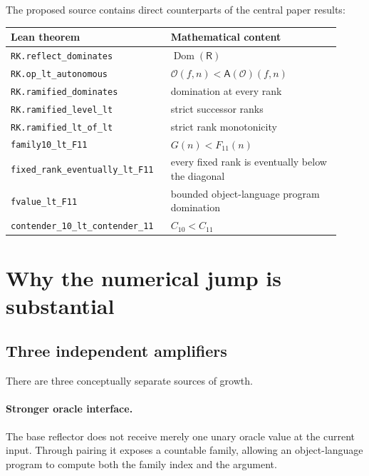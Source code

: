 \documentclass[11pt,oneside]{article}
\theoremstyle{definition}
\newcommand{\Op}{\mathcal O}
\newcommand{\Reflect}{\mathsf R}
\newcommand{\Auto}{\mathsf A}
\newcommand{\code}[1]{\texttt{#1}}
\begin{document}
\begin{summarybox}
The proposed source contains direct counterparts of the central paper results:
\begin{center}
\begin{tabular}{@{}p{0.43\linewidth}p{0.49\linewidth}@{}}
\toprule
Lean theorem & Mathematical content \\
\midrule
\code{RK.reflect\_dominates} & $\operatorname{Dom}(\Reflect)$ \\
\code{RK.op\_lt\_autonomous} & $\Op(f,n)<\Auto(\Op)(f,n)$ \\
\code{RK.ramified\_dominates} & domination at every rank \\
\code{RK.ramified\_level\_lt} & strict successor ranks \\
\code{RK.ramified\_lt\_of\_lt} & strict rank monotonicity \\
\code{family10\_lt\_F11} & $G(n)<F_{11}(n)$ \\
\code{fixed\_rank\_eventually\_lt\_F11} & every fixed rank is eventually below the diagonal \\
\code{fvalue\_lt\_F11} & bounded object-language program domination \\
\code{contender\_10\_lt\_contender\_11} & $C_{10}<C_{11}$ \\
\bottomrule
\end{tabular}
\end{center}
\end{summarybox}

\section{Why the numerical jump is substantial}

\subsection{Three independent amplifiers}

There are three conceptually separate sources of growth.

\paragraph{Stronger oracle interface.}
The base reflector does not receive merely one unary oracle value at the
current input.  Through pairing it exposes a countable family, allowing an
object-language program to compute both the family index and the argument.
\end{document}
